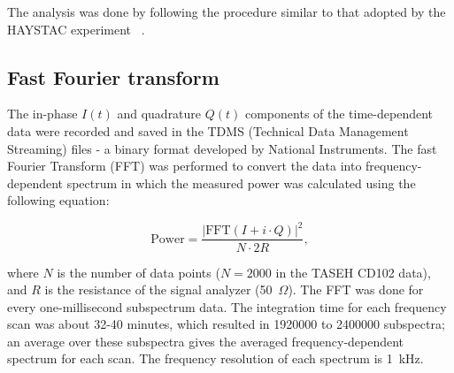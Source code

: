     The analysis was done by following the procedure similar to that 
adopted by the HAYSTAC experiment ~\cite{HAYSTACII}.

\subsection{Fast Fourier transform}
The in-phase $I(t)$ and quadrature $Q(t)$ components of the time-dependent 
data were recorded and saved in the TDMS 
(Technical Data Management Streaming) files - a 
binary format developed by National Instruments.
The fast Fourier Transform (FFT) was performed to convert the data into 
frequency-dependent spectrum in which the measured power was calculated 
using the following equation:

\begin{equation}
\label{eq:4.1}
    \text{Power} = \frac{|\text{FFT}(I+i \cdot Q)|^{2}}{N \cdot 2R},
\end{equation}

where $N$ is the number of data points ($N  = 2000$ in the TASEH 
CD102 data), and $R$ is the resistance of the signal analyzer (50~$\Omega$).
The FFT was done for every one-millisecond subspectrum data. The integration 
time for each frequency scan was about 32-40 minutes, which resulted 
in 1920000 to 2400000 subspectra; an average over these subspectra gives 
the averaged frequency-dependent spectrum for each scan. 
The frequency resolution of each spectrum is 1~kHz. 


